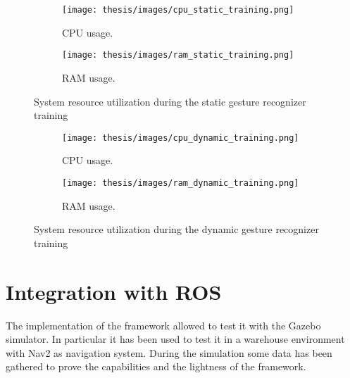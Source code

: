 \documentclass[../thesis.tex]{subfiles}
\begin{document}
\begin{figure}[H]
    \centering
    \begin{subfigure}[b]{0.45\textwidth}
        \centering
        \texttt{[image: thesis/images/cpu\_static\_training.png]}
        \caption{CPU usage.}
        \label{fig:cpu_usage_static_training}
    \end{subfigure}
    \hfill
    \begin{subfigure}[b]{0.45\textwidth}
        \centering
        \texttt{[image: thesis/images/ram\_static\_training.png]}
        \caption{RAM usage.}
        \label{fig:ram_usage_static_training}
    \end{subfigure}
    \caption{System resource utilization during the static gesture recognizer training}
    \label{fig:system_resource_graphs_static_training}
\end{figure}

\begin{figure}[H]
    \centering
    \begin{subfigure}[b]{0.45\textwidth}
        \centering
        \texttt{[image: thesis/images/cpu\_dynamic\_training.png]}
        \caption{CPU usage.}
        \label{fig:cpu_usage_dynamic_training}
    \end{subfigure}
    \hfill
    \begin{subfigure}[b]{0.45\textwidth}
        \centering
        \texttt{[image: thesis/images/ram\_dynamic\_training.png]}
        \caption{RAM usage.}
        \label{fig:ram_usage_dynamic_training}
    \end{subfigure}
    \caption{System resource utilization during the dynamic gesture recognizer training}
    \label{fig:system_resource_graphs_dynamic_training}
\end{figure}

\section{Integration with ROS}
The implementation of the framework allowed to test it with the Gazebo simulator. In particular it has been used to test it in a warehouse environment with Nav2 as navigation system. During the simulation some data has been gathered to prove the capabilities and the lightness of the framework.
\end{document}
